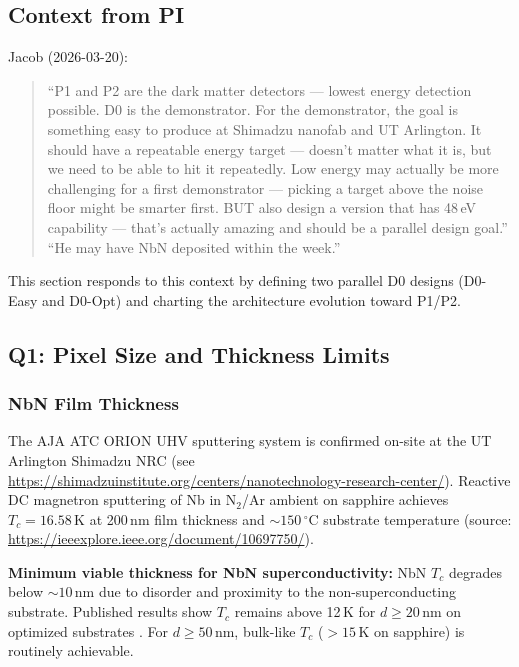 \subsection{Context from PI}
\label{sec:q1_context}

Jacob (2026-03-20):

\begin{quote}
``P1 and P2 are the dark matter detectors --- lowest energy detection possible.
D0 is the demonstrator. For the demonstrator, the goal is something easy to
produce at Shimadzu nanofab and UT Arlington. It should have a repeatable energy
target --- doesn't matter what it is, but we need to be able to hit it repeatedly.
Low energy may actually be more challenging for a first demonstrator --- picking a
target above the noise floor might be smarter first. BUT also design a version that
has 48\,eV capability --- that's actually amazing and should be a parallel design
goal.''
``He may have NbN deposited within the week.''
\end{quote}

This section responds to this context by defining two parallel D0 designs (D0-Easy
and D0-Opt) and charting the architecture evolution toward P1/P2.

\subsection{Q1: Pixel Size and Thickness Limits}
\label{sec:q1}

\subsubsection{NbN Film Thickness}
\label{sec:q1_thickness}

The AJA ATC ORION UHV sputtering system is confirmed on-site at the UT Arlington
Shimadzu NRC (see
\url{https://shimadzuinstitute.org/centers/nanotechnology-research-center/}).
Reactive DC magnetron sputtering of Nb in N$_2$/Ar ambient on sapphire achieves
$T_c = 16.58$\,K at 200\,nm film thickness and
$\sim\!150\,^\circ\mathrm{C}$ substrate temperature
(source: \url{https://ieeexplore.ieee.org/document/10697750/}).

\textbf{Minimum viable thickness for NbN superconductivity:}
NbN $T_c$ degrades below $\sim\!10$\,nm due to disorder and proximity to the
non-superconducting substrate. Published results show $T_c$ remains above 12\,K for
$d \geq 20$\,nm on optimized substrates
.
For $d \geq 50$\,nm, bulk-like $T_c$ ($>15$\,K on sapphire) is routinely
achievable.

